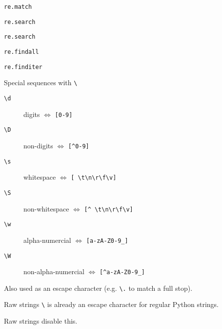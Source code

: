 \begin{frame}{\texttt{re.match}}
\end{frame}

\begin{frame}{\texttt{re.search}}
\end{frame}

\begin{frame}{\texttt{re.search}}
\end{frame}

\begin{frame}{\texttt{re.findall}}
\end{frame}

\begin{frame}{\texttt{re.finditer}}
\end{frame}

\begin{frame}{Special sequences with \texttt{\textbackslash}}
  \begin{description}
  \item[\texttt{\textbackslash d}] digits $\iff$ \texttt{[0-9]}
  \item[\texttt{\textbackslash D}] non-digits $\iff$ \texttt{[\^{}0-9]}
  \item[\texttt{\textbackslash s}] whitespace $\iff$ \texttt{[ \textbackslash t\textbackslash n\textbackslash r\textbackslash f\textbackslash v]}
  \item[\texttt{\textbackslash S}] non-whitespace $\iff$ \texttt{[\^{} \textbackslash t\textbackslash n\textbackslash r\textbackslash f\textbackslash v]}
  \item[\texttt{\textbackslash w}] alpha-numercial $\iff$ \texttt{[a-zA-Z0-9\_]}
  \item[\texttt{\textbackslash W}] non-alpha-numercial $\iff$ \texttt{[\^{}a-zA-Z0-9\_]}
  \end{description}
  Also used as an escape character (e.g. \texttt{\textbackslash .} to match a full stop).
\end{frame}

\begin{frame}{Raw strings}
  \texttt{\textbackslash} is already an escape character for regular Python strings.

  Raw strings disable this.

\end{frame}

